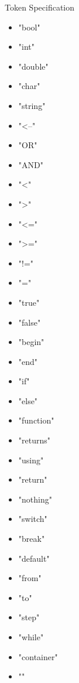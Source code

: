 
Token Specification 

\begin{itemize}

\item "bool"
\item "int"
\item "double"
\item "char"
\item "string"
\item "<--"
\item "OR"
\item "AND"
\item "<"
\item ">"
\item "<="
\item ">="
\item "!="
\item "="
\item "true"
\item "false"
\item "begin"
\item "end"
\item "if"
\item "else"
\item "function"
\item "returns"
\item "using"
\item "return"
\item "nothing"
\item "switch"
\item "break"
\item "default"
\item "from"
\item "to"
\item "step"
\item "while"
\item "container"




\item ""
\end{itemize}